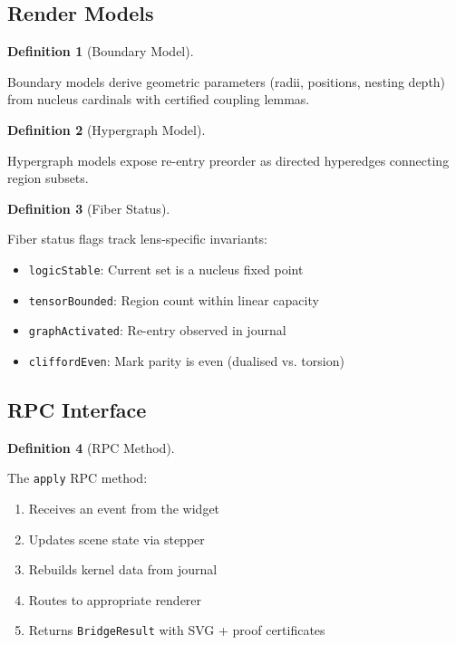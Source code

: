 \documentclass{amsart}
\theoremstyle{definition}
\newtheorem{definition}{Definition}[section]
\theoremstyle{remark}
\begin{document}
\subsection{Render Models}
\label{sec:render-models}

\begin{definition}[Boundary Model]
\label{def:boundary-model}

Boundary models derive geometric parameters (radii, positions, nesting depth) from nucleus cardinals with certified coupling lemmas.
\end{definition}

\begin{definition}[Hypergraph Model]
\label{def:hypergraph-model}

Hypergraph models expose re-entry preorder as directed hyperedges connecting region subsets.
\end{definition}

\begin{definition}[Fiber Status]
\label{def:fiber-status}

Fiber status flags track lens-specific invariants:
\begin{itemize}
\item \texttt{logicStable}: Current set is a nucleus fixed point
\item \texttt{tensorBounded}: Region count within linear capacity
\item \texttt{graphActivated}: Re-entry observed in journal
\item \texttt{cliffordEven}: Mark parity is even (dualised vs. torsion)
\end{itemize}
\end{definition}

\subsection{RPC Interface}
\label{sec:rpc}

\begin{definition}[RPC Method]
\label{def:rpc-apply}

The \texttt{apply} RPC method:
\begin{enumerate}
\item Receives an event from the widget
\item Updates scene state via stepper
\item Rebuilds kernel data from journal
\item Routes to appropriate renderer
\item Returns \texttt{BridgeResult} with SVG + proof certificates
\end{enumerate}
\end{definition}
\end{document}
